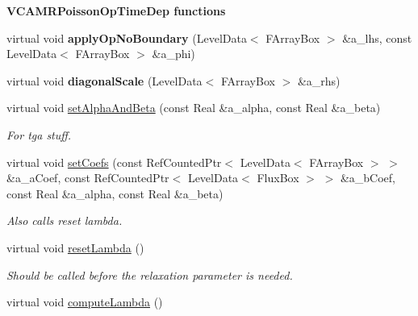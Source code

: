 \begin{Indent}{\bf V\-C\-A\-M\-R\-Poisson\-Op\-Time\-Dep functions}
\begin{DoxyCompactItemize}
\item 
\hypertarget{class_v_c_a_m_r_poisson_op_time_dep_a8fdad31c4f2347879200623b83e5e04d}{virtual void {\bfseries apply\-Op\-No\-Boundary} (Level\-Data$<$ F\-Array\-Box $>$ \&a\-\_\-lhs, const Level\-Data$<$ F\-Array\-Box $>$ \&a\-\_\-phi)}\label{class_v_c_a_m_r_poisson_op_time_dep_a8fdad31c4f2347879200623b83e5e04d}

\item 
\hypertarget{class_v_c_a_m_r_poisson_op_time_dep_aa3de35b3fefd32603a8cc440244cf3be}{virtual void {\bfseries diagonal\-Scale} (Level\-Data$<$ F\-Array\-Box $>$ \&a\-\_\-rhs)}\label{class_v_c_a_m_r_poisson_op_time_dep_aa3de35b3fefd32603a8cc440244cf3be}

\item 
\hypertarget{class_v_c_a_m_r_poisson_op_time_dep_ae82bf09779dfe39716d57ed7117e4e5b}{virtual void \hyperlink{class_v_c_a_m_r_poisson_op_time_dep_ae82bf09779dfe39716d57ed7117e4e5b}{set\-Alpha\-And\-Beta} (const Real \&a\-\_\-alpha, const Real \&a\-\_\-beta)}\label{class_v_c_a_m_r_poisson_op_time_dep_ae82bf09779dfe39716d57ed7117e4e5b}

\begin{DoxyCompactList}\small\item\em For tga stuff. \end{DoxyCompactList}\item 
\hypertarget{class_v_c_a_m_r_poisson_op_time_dep_a328269ff38ea1818cf3cc9b751d2abd9}{virtual void \hyperlink{class_v_c_a_m_r_poisson_op_time_dep_a328269ff38ea1818cf3cc9b751d2abd9}{set\-Coefs} (const Ref\-Counted\-Ptr$<$ Level\-Data$<$ F\-Array\-Box $>$ $>$ \&a\-\_\-a\-Coef, const Ref\-Counted\-Ptr$<$ Level\-Data$<$ Flux\-Box $>$ $>$ \&a\-\_\-b\-Coef, const Real \&a\-\_\-alpha, const Real \&a\-\_\-beta)}\label{class_v_c_a_m_r_poisson_op_time_dep_a328269ff38ea1818cf3cc9b751d2abd9}

\begin{DoxyCompactList}\small\item\em Also calls reset lambda. \end{DoxyCompactList}\item 
\hypertarget{class_v_c_a_m_r_poisson_op_time_dep_a40c3515b270a770bc0ea378ed960c188}{virtual void \hyperlink{class_v_c_a_m_r_poisson_op_time_dep_a40c3515b270a770bc0ea378ed960c188}{reset\-Lambda} ()}\label{class_v_c_a_m_r_poisson_op_time_dep_a40c3515b270a770bc0ea378ed960c188}

\begin{DoxyCompactList}\small\item\em Should be called before the relaxation parameter is needed. \end{DoxyCompactList}\item 
\hypertarget{class_v_c_a_m_r_poisson_op_time_dep_afded4199467cdf62730bcdf6b9331160}{virtual void \hyperlink{class_v_c_a_m_r_poisson_op_time_dep_afded4199467cdf62730bcdf6b9331160}{compute\-Lambda} ()}\label{class_v_c_a_m_r_poisson_op_time_dep_afded4199467cdf62730bcdf6b9331160}


\end{DoxyCompactItemize}
\end{Indent}
